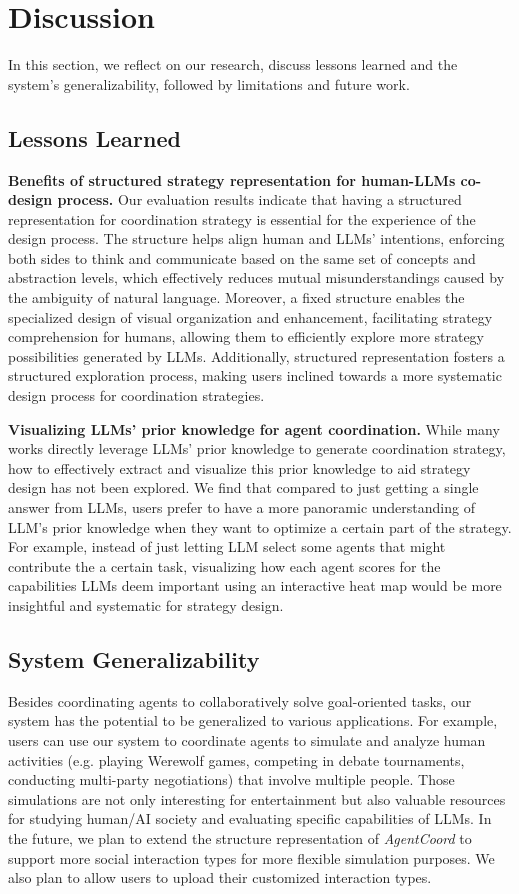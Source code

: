 \section{Discussion}

In this section, we reflect on our research, discuss lessons learned and the system's generalizability, followed by limitations and future work. 

\subsection{Lessons Learned}
\textbf{Benefits of structured strategy representation for human-LLMs co-design process.} Our evaluation results indicate that having a structured representation for coordination strategy is essential for the experience of the design process. The structure helps align human and LLMs' intentions, enforcing both sides to think and communicate based on the same set of concepts and abstraction levels, which effectively reduces mutual misunderstandings caused by the ambiguity of natural language. Moreover, a fixed structure enables the specialized design of visual organization and enhancement, facilitating strategy comprehension for humans, allowing them to efficiently explore more strategy possibilities generated by LLMs. Additionally, structured representation fosters a structured exploration process, making users inclined towards a more systematic design process for coordination strategies.

\textbf{Visualizing LLMs' prior knowledge for agent coordination.} While many works directly leverage LLMs' prior knowledge to generate coordination strategy, how to effectively extract and visualize this prior knowledge to aid strategy design has not been explored. We find that compared to just getting a single answer from LLMs, users prefer to have a more panoramic understanding of LLM's prior knowledge when they want to optimize a certain part of the strategy. For example, instead of just letting LLM select some agents that might contribute the a certain task, visualizing how each agent scores for the capabilities LLMs deem important using an interactive heat map would be more insightful and systematic for strategy design. 

\subsection{System Generalizability}
Besides coordinating agents to collaboratively solve goal-oriented tasks, our system has the potential to be generalized to various applications. For example, users can use our system to coordinate agents to simulate and analyze human activities (e.g. playing Werewolf games, competing in debate tournaments, conducting multi-party negotiations) that involve multiple people. Those simulations are not only interesting for entertainment but also valuable resources for studying human/AI society and evaluating specific capabilities of LLMs. In the future, we plan to extend the structure representation of \textit{AgentCoord} to support more social interaction types for more flexible simulation purposes. We also plan to allow users to upload their customized interaction types.



